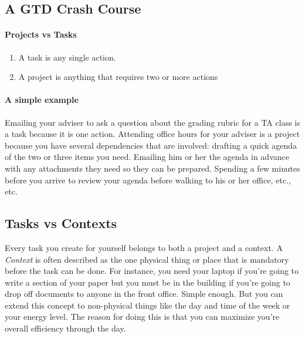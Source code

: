 \documentclass{tufte-handout}
\begin{document}
\subsection{A GTD Crash Course}
\label{gtd-crash-course}

\paragraph{Projects vs Tasks}
\label{sec:proj-tasks}

\begin{enumerate}
\item[] A task is any single action.
\item[] A project is anything that requires two or more actions
\end{enumerate}

\paragraph{A simple example}

Emailing your adviser to ask a question about the grading rubric for a
TA class is a task because it is one action. Attending office hours
for your adviser is a project because you have several dependencies
that are involved: drafting a quick agenda of the two or three items
you need. Emailing him or her the agenda in advance with any
attachments they need so they can be prepared. Spending a few minutes
before you arrive to review your agenda before walking to his or her
office, etc., etc. 


\subsection{Tasks vs Contexts}
\label{tasks-contexts}

Every task you create for yourself belongs to both a project and a
context. A \textit{Context} is often described as
the one physical thing or place that is mandatory before the task can
be done. For instance, you need your laptop if you're going to write a
section of your paper but you must be in the building if you're going to drop
off documents to anyone in the front office. Simple enough. But you
can extend this concept to non-physical things like the day and time
of the week or your energy level. The reason for doing this is that
you can maximize you're overall efficiency through the day.
\end{document}
